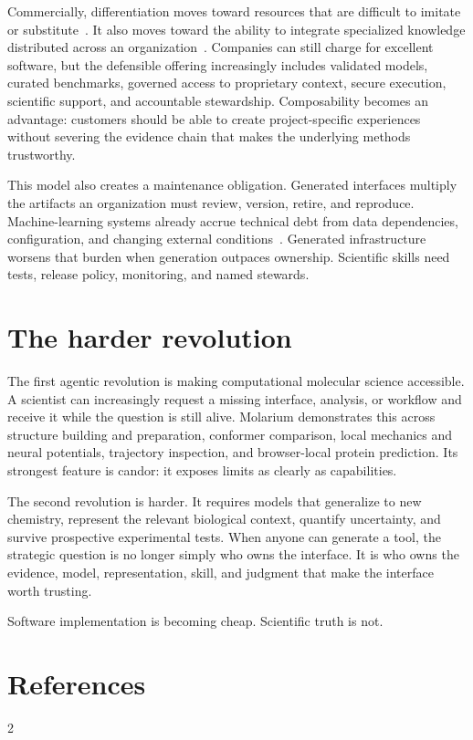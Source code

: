 \documentclass[10pt]{article}
\begin{document}
Commercially, differentiation moves toward resources that are difficult to imitate or substitute~\cite{barney1991resources}.
It also moves toward the ability to integrate specialized knowledge distributed across an organization~\cite{grant1996knowledge}.
Companies can still charge for excellent software, but the defensible offering increasingly includes validated models, curated benchmarks, governed access to proprietary context, secure execution, scientific support, and accountable stewardship.
Composability becomes an advantage: customers should be able to create project-specific experiences without severing the evidence chain that makes the underlying methods trustworthy.

This model also creates a maintenance obligation.
Generated interfaces multiply the artifacts an organization must review, version, retire, and reproduce.
Machine-learning systems already accrue technical debt from data dependencies, configuration, and changing external conditions~\cite{sculley2015debt}.
Generated infrastructure worsens that burden when generation outpaces ownership.
Scientific skills need tests, release policy, monitoring, and named stewards.

\section*{The harder revolution}

The first agentic revolution is making computational molecular science accessible.
A scientist can increasingly request a missing interface, analysis, or workflow and receive it while the question is still alive.
Molarium demonstrates this across structure building and preparation, conformer comparison, local mechanics and neural potentials, trajectory inspection, and browser-local protein prediction.
Its strongest feature is candor: it exposes limits as clearly as capabilities.

The second revolution is harder.
It requires models that generalize to new chemistry, represent the relevant biological context, quantify uncertainty, and survive prospective experimental tests.
When anyone can generate a tool, the strategic question is no longer simply who owns the interface.
It is who owns the evidence, model, representation, skill, and judgment that make the interface worth trusting.

Software implementation is becoming cheap.
Scientific truth is not.

\section*{References}
\vspace{-0.8em}
\renewcommand{\bibsection}{}
\begin{multicols}{2}


\end{multicols}
\end{document}

